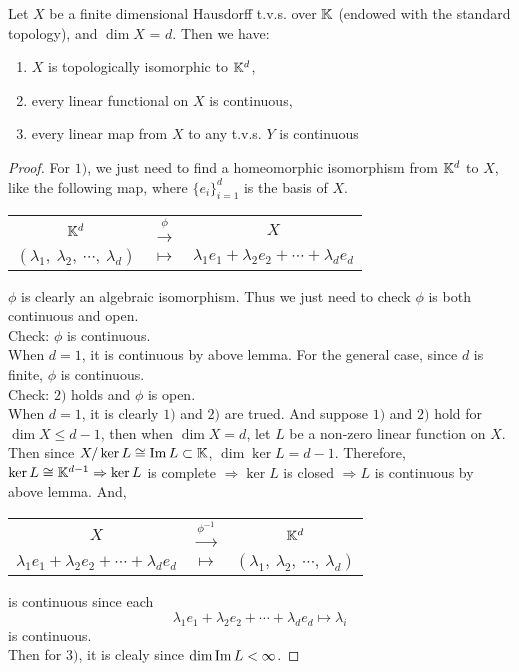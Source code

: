 \documentclass[a4paper,11pt]{report}
\begin{document}
\begin{thm}
	Let $X$ be a finite dimensional Hausdorff t.v.s. over $\mathbb{K}$ (endowed with the standard topology), and $\dim{X}$ = $d$. Then we have: 
	\begin{enumerate}[label=\arabic*)]
		\item $X$ is topologically isomorphic to $\mathbb{K}^{d}$,
		\item every linear  functional on $X$ is continuous,
		\item every linear map from $X$ to any t.v.s. $Y$ is continuous
	\end{enumerate}
\end{thm}
\begin{proof}
	For $1)$, we just need to find a homeomorphic isomorphism from $\mathbb{K}^{d}$ to $X$, like the following map, where $\{e_i\}_{i=1}^{d}$ is the basis of $X$.
	\begin{center}
		\begin{tabular}{c c c}
			$\mathbb{K}^{d}$ & $\stackrel{\phi}{\longrightarrow}$ & $X$ \\
			$(\lambda_1,~ \lambda_2,~ \cdots,~ \lambda_d)$  & $\longmapsto$ & $\lambda_1 e_1 + \lambda_2 e_2 + \cdots + \lambda_d e_d$
		\end{tabular} 
	\end{center}
	$\phi$ is clearly an algebraic isomorphism. Thus we just need to check $\phi$ is both continuous and open.\\
	Check: $\phi$ is continuous.\\
	When $d = 1$, it is continuous by above lemma. For the general case, since $d$ is finite, $\phi$ is continuous.\\
	Check: $2)$ holds and $\phi$ is open.\\
	When $d = 1$, it is clearly $1)$ and $2)$ are trued. And suppose $1)$ and $2)$ hold for $\dim{X} \leqslant d-1$, then when $\dim{X} = d$, let $L$ be a non-zero linear function on $X$. Then since $X/\ker{L}\cong\operatorname{Im}{L} \subset \mathbb{K}$, $\dim{\ker{L}} = d-1$. Therefore, $\ker{L}\cong\mathbb{K}^{d-1} \Rightarrow \ker{L}$ is complete $\Rightarrow \ker{L}$ is closed $\Rightarrow L$ is continuous by above lemma. And,  
	\begin{center}
		\begin{tabular}{c c c}
			$X$ & $\stackrel{\phi^{-1}}{\longrightarrow}$ & $\mathbb{K}^{d}$ \\
			$\lambda_1 e_1 + \lambda_2 e_2 + \cdots + \lambda_d e_d$  & $\longmapsto$ & $(\lambda_1,~ \lambda_2,~ \cdots,~ \lambda_d)$
		\end{tabular} 
	\end{center}
	is continuous since each 
	\begin{equation*}	
			\lambda_1 e_1 + \lambda_2 e_2 + \cdots + \lambda_d e_d \longmapsto \lambda_i
	\end{equation*}
	is continuous.\\
	Then for $3)$, it is clealy since $\dim{\operatorname{Im}{L}} < \infty$. 
\end{proof}
 
\end{document}
